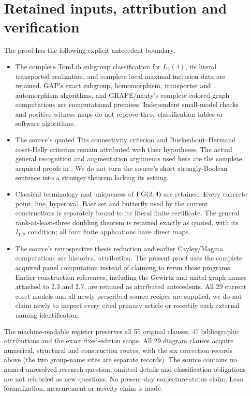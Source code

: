 \documentclass[11pt]{article}
\begin{document}
\section{Retained inputs, attribution and verification}\label{inputs}
The proof has the following explicit antecedent boundary.
\begin{itemize}
\item The complete TomLib subgroup classification for $L_3(4)$,
its literal transported realization, and complete local maximal
inclusion data are retained. GAP's exact subgroup, homomorphism,
transporter and automorphism algorithms, and GRAPE/nauty's complete
colored-graph computations are computational premises. Independent
small-model checks and positive witness maps do not reprove these
classification tables or software algorithms.
\item The source's quoted Tits connectivity criterion and
Buekenhout--Hermand coset-Helly criterion remain attributed with
their hypotheses. The actual general recognition and augmentation
arguments used here are the complete acquired proofs in
\cite{Panel}. We do not turn the source's short strongly-Boolean
sentence into a stronger theorem lacking its setting.
\item Classical terminology and uniqueness of $\operatorname{PG}(2,4)$ are
retained. Every concrete point, line, hyperoval, Baer set and
butterfly used by the current constructions is separately bound
to its literal finite certificate. The general rank-at-least-three
doubling theorem is retained exactly as quoted, with its $I_{1,2}$
condition; all four finite applications have direct maps.
\item The source's retrospective thesis reduction and earlier
Cayley/Magma computations are historical attribution. The present
proof uses the complete acquired panel computation instead of
claiming to rerun those programs. Earlier construction references,
including the Gewirtz and unital graph names attached to 2.3 and
2.7, are retained as attributed antecedents. All 29 current coset
models and all newly prescribed source recipes are supplied;
we do not claim newly to inspect every cited primary article or
recertify each external naming identification.
\end{itemize}

The machine-readable register preserves all 55 original clauses,
47 bibliographic attributions and the exact fixed-edition scope.
All 29 diagram clauses acquire numerical, structural and construction
routes, with the six correction records above (the two group-name
sites are separate records). The source contains no named unresolved
research question; omitted details and classification obligations
are not relabeled as new questions. No present-day conjecture-status
claim, Lean formalization, measurement or novelty claim is made.
\end{document}
